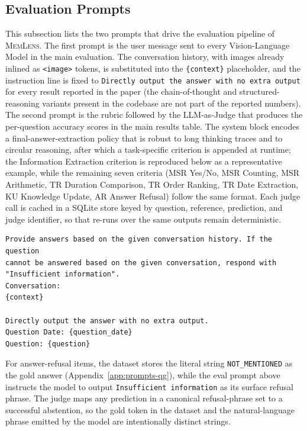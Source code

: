 \documentclass{article}
\newcommand{\bench}{\textsc{MemLens}}
\begin{document}
\subsection{Evaluation Prompts}
\label{app:prompts-eval}

This subsection lists the two prompts that drive the evaluation pipeline of \bench. The first prompt is the user message sent to every Vision-Language Model in the main evaluation. The conversation history, with images already inlined as \texttt{<image>} tokens, is substituted into the \texttt{\{context\}} placeholder, and the instruction line is fixed to \texttt{Directly output the answer with no extra output} for every result reported in the paper (the chain-of-thought and structured-reasoning variants present in the codebase are not part of the reported numbers). The second prompt is the rubric followed by the LLM-as-Judge that produces the per-question accuracy scores in the main results table. The system block encodes a final-answer-extraction policy that is robust to long thinking traces and to circular reasoning, after which a task-specific criterion is appended at runtime; the Information Extraction criterion is reproduced below as a representative example, while the remaining seven criteria (MSR Yes/No, MSR Counting, MSR Arithmetic, TR Duration Comparison, TR Order Ranking, TR Date Extraction, KU Knowledge Update, AR Answer Refusal) follow the same format. Each judge call is cached in a SQLite store keyed by question, reference, prediction, and judge identifier, so that re-runs over the same outputs remain deterministic.

\begin{promptbox}[colback=black!5, colframe=white!40!black, title=LVLM Evaluator User Prompt]{}
\scriptsize
\begin{verbatim}
Provide answers based on the given conversation history. If the question
cannot be answered based on the given conversation, respond with
"Insufficient information".
Conversation:
{context}

Directly output the answer with no extra output.
Question Date: {question_date}
Question: {question}
\end{verbatim}
\end{promptbox}

For answer-refusal items, the dataset stores the literal string \texttt{NOT\_MENTIONED} as the gold answer (Appendix~\ref{app:prompts-qg}), while the eval prompt above instructs the model to output \texttt{Insufficient information} as its surface refusal phrase. The judge maps any prediction in a canonical refusal-phrase set to a successful abstention, so the gold token in the dataset and the natural-language phrase emitted by the model are intentionally distinct strings.
\end{document}
